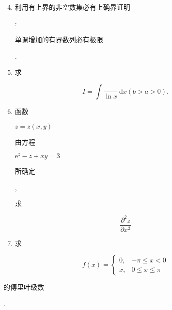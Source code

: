 \documentclass[10pt]{article}
\begin{document}
\begin{enumerate}
  \setcounter{enumi}{3}
  \item \begin{CJK}{UTF8}{mj}利用有上界的非空数集必有上确界证明\end{CJK}: \begin{CJK}{UTF8}{mj}单调增加的有界数列必有极限\end{CJK}.

  \item \begin{CJK}{UTF8}{mj}求\end{CJK}

\end{enumerate}
$$
I=\int \frac{}{\ln x} \mathrm{~d} x(b>a>0) .
$$

\begin{enumerate}
  \setcounter{enumi}{5}
  \item \begin{CJK}{UTF8}{mj}函数\end{CJK} $z=z(x, y)$ \begin{CJK}{UTF8}{mj}由方程\end{CJK} $\mathrm{e}^{z}-z+x y=3$ \begin{CJK}{UTF8}{mj}所确定\end{CJK}, \begin{CJK}{UTF8}{mj}求\end{CJK}
\end{enumerate}
$$
\frac{\partial^{2} z}{\partial x^{2}}
$$

\begin{enumerate}
  \setcounter{enumi}{6}
  \item \begin{CJK}{UTF8}{mj}求\end{CJK}
\end{enumerate}
$$
f(x)= \begin{cases}0, & -\pi \leq x<0 \\ x, & 0 \leq x \leq \pi\end{cases}
$$
\begin{CJK}{UTF8}{mj}的傅里叶级数\end{CJK}.
\end{document}

